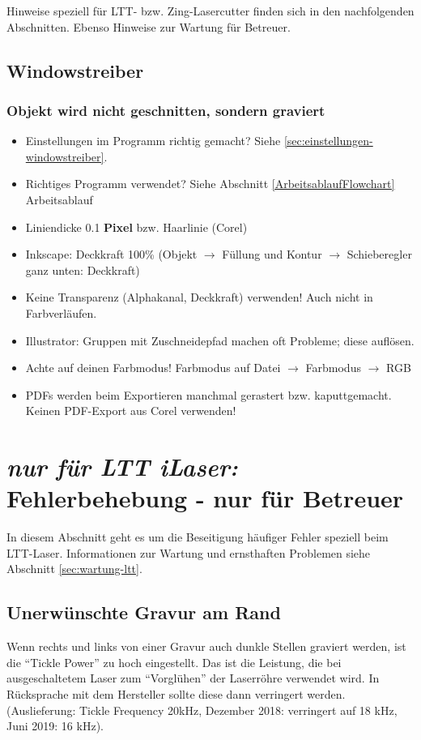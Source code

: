 \documentclass{\basedir/fablab-document}
\newcommand{\nurLTT}{\emph{nur für LTT iLaser:} }
\begin{document}
	Hinweise speziell für LTT- bzw. Zing-Lasercutter finden sich in den nachfolgenden Abschnitten. Ebenso Hinweise zur Wartung für Betreuer.

	\subsection{Windowstreiber}
	\subsubsection{Objekt wird nicht geschnitten, sondern graviert}
	\begin{itemize}
		\item Einstellungen im Programm richtig gemacht? Siehe \cref{sec:einstellungen-windowstreiber}.
		\item Richtiges Programm verwendet? Siehe Abschnitt \ref{ArbeitsablaufFlowchart} Arbeitsablauf
		\item Liniendicke 0.1 \textbf{Pixel} bzw. Haarlinie (Corel)
		\item Inkscape: Deckkraft 100\% (Objekt $\rightarrow$ Füllung und Kontur $\rightarrow$ Schieberegler ganz unten: Deckkraft)
		\item Keine Transparenz (Alphakanal, Deckkraft) verwenden! Auch nicht in Farbverläufen.
		\item Illustrator: Gruppen mit Zuschneidepfad machen oft Probleme; diese auflösen.
		\item Achte auf deinen Farbmodus! Farbmodus auf Datei $\rightarrow$ Farbmodus $\rightarrow$ RGB
		\item PDFs werden beim Exportieren manchmal gerastert bzw. kaputtgemacht. Keinen PDF-Export aus Corel verwenden!
	\end{itemize}

	\section{\nurLTT Fehlerbehebung - nur für Betreuer}
	In diesem Abschnitt geht es um die Beseitigung häufiger Fehler speziell beim LTT-Laser.
	Informationen zur Wartung und ernsthaften Problemen siehe Abschnitt \ref{sec:wartung-ltt}.


	\subsection{Unerwünschte Gravur am Rand}
	Wenn rechts und links von einer Gravur auch dunkle Stellen graviert werden, ist die \enquote{Tickle Power} zu hoch eingestellt. Das ist die Leistung, die bei ausgeschaltetem Laser zum \enquote{Vorglühen} der Laserröhre verwendet wird. In Rücksprache mit dem Hersteller sollte diese dann verringert werden. (Auslieferung: Tickle Frequency 20kHz, Dezember 2018: verringert auf 18 kHz, Juni 2019: 16 kHz).
\end{document}
